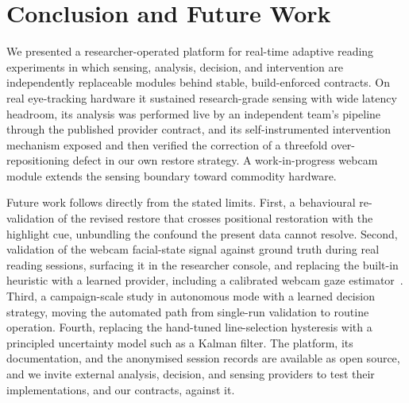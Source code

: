 \section{Conclusion and Future Work}
\label{sec:conclusion}

We presented a researcher-operated platform for real-time adaptive reading experiments in which sensing, analysis, decision, and intervention are independently replaceable modules behind stable, build-enforced contracts.
On real eye-tracking hardware it sustained research-grade sensing with wide latency headroom, its analysis was performed live by an independent team's pipeline through the published provider contract, and its self-instrumented intervention mechanism exposed and then verified the correction of a threefold over-repositioning defect in our own restore strategy.
A work-in-progress webcam module extends the sensing boundary toward commodity hardware.

Future work follows directly from the stated limits.
First, a behavioural re-validation of the revised restore that crosses positional restoration with the highlight cue, unbundling the confound the present data cannot resolve.
Second, validation of the webcam facial-state signal against ground truth during real reading sessions, surfacing it in the researcher console, and replacing the built-in heuristic with a learned provider, including a calibrated webcam gaze estimator~\cite{lin2022webcam}.
Third, a campaign-scale study in autonomous mode with a learned decision strategy, moving the automated path from single-run validation to routine operation.
Fourth, replacing the hand-tuned line-selection hysteresis with a principled uncertainty model such as a Kalman filter.
The platform, its documentation, and the anonymised session records are available as open source, and we invite external analysis, decision, and sensing providers to test their implementations, and our contracts, against it.
